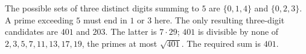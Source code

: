 The possible sets of three distinct digits summing to $5$ are $\{0,1,4\}$ and $\{0,2,3\}$. A prime exceeding $5$ must end in $1$ or $3$ here. The only resulting three-digit candidates are $401$ and $203$. The latter is $7\cdot29$; $401$ is divisible by none of $2,3,5,7,11,13,17,19$, the primes at most $\sqrt{401}$. The required sum is $\boxed{401}$.
